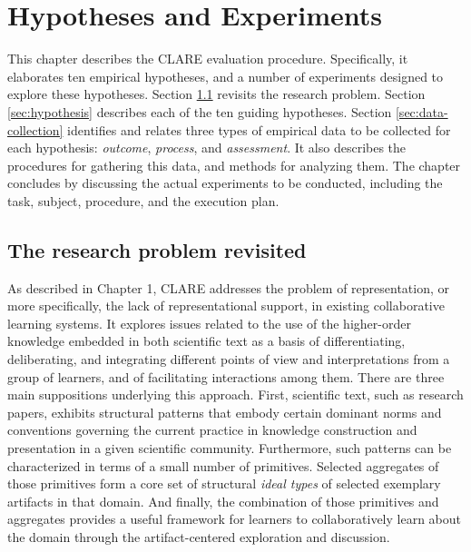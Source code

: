 
\setcounter{chapter}{4}
\chapter{Hypotheses and Experiments}

This chapter describes the CLARE evaluation procedure. Specifically, it
elaborates ten empirical hypotheses, and a number of experiments designed
to explore these hypotheses. Section \ref{sec:problem-revisit} revisits the
research problem. Section \ref{sec:hypothesis} describes each of the ten
guiding hypotheses.  Section \ref{sec:data-collection} identifies and
relates three types of empirical data to be collected for each hypothesis:
{\it outcome\/}, {\it process\/}, and {\it assessment\/}. It also describes
the procedures for gathering this data, and methods for analyzing them. The
chapter concludes by discussing the actual experiments to be conducted,
including the task, subject, procedure, and the execution plan.


\section{The research problem revisited}
\label{sec:problem-revisit}

As described in Chapter 1, CLARE addresses the problem of representation,
or more specifically, the lack of representational support, in existing
collaborative learning systems. It explores issues related to the use of
the higher-order knowledge embedded in both scientific text as a basis of
differentiating, deliberating, and integrating different points of view and
interpretations from a group of learners, and of facilitating interactions
among them. There are three main suppositions underlying this approach.
First, scientific text, such as research papers, exhibits structural
patterns that embody certain dominant norms and conventions governing the
current practice in knowledge construction and presentation in a given
scientific community. Furthermore, such patterns can be characterized in
terms of a small number of primitives.  Selected aggregates of those
primitives form a core set of structural {\it ideal types\/} of selected
exemplary artifacts in that domain. And finally, the combination of those
primitives and aggregates provides a useful framework for learners to
collaboratively learn about the domain through the artifact-centered
exploration and discussion.

